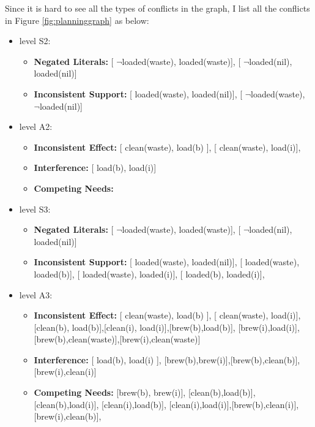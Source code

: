 \documentclass{article}%
\begin{document}
\begin{enumerate}
\begin{enumerate}
  Since it is hard to see all the types of conflicts in the graph, I list all the conflicts in Figure \ref{fig:planninggraph} as below:
  \begin{itemize}
  	\item  level S2:
  			\begin{itemize}
 				 \item \textbf{Negated Literals:} [ $\neg$loaded(waste), loaded(waste)], [ $\neg$loaded(nil), loaded(nil)]
 				 \item \textbf{Inconsistent Support:}  [ loaded(waste), loaded(nil)], [ $\neg$loaded(waste), $\neg$loaded(nil)]
			\end{itemize}
	\item  level A2: 
			\begin{itemize}
 				 \item \textbf{Inconsistent Effect:} [ clean(waste), load(b) ], [ clean(waste), load(i)], 
 				 \item \textbf{Interference:}  [ load(b), load(i)]
 				 \item \textbf{Competing Needs:} 
			\end{itemize}
	\item  level S3:
  			\begin{itemize}
 				 \item \textbf{Negated Literals:} [ $\neg$loaded(waste), loaded(waste)], [ $\neg$loaded(nil), loaded(nil)]
 				 \item \textbf{Inconsistent Support:}  [ loaded(waste), loaded(nil)], [ loaded(waste), loaded(b)], [ loaded(waste), loaded(i)], 
 				 [ loaded(b), loaded(i)], 
			\end{itemize}
	\item  level A3: 
			\begin{itemize}
 				 \item \textbf{Inconsistent Effect:} [ clean(waste), load(b) ], [ clean(waste), load(i)], 
 				 [clean(b), load(b)],[clean(i), load(i)],[brew(b),load(b)],
 				 [brew(i),load(i)],[brew(b),clean(waste)],[brew(i),clean(waste)]
 				 \item \textbf{Interference:}  [ load(b), load(i) ], [brew(b),brew(i)],[brew(b),clean(b)],[brew(i),clean(i)]
 				 \item \textbf{Competing Needs:}  [brew(b), brew(i)], [clean(b),load(b)], [clean(b),load(i)],
 				 [clean(i),load(b)], [clean(i),load(i)],[brew(b),clean(i)],[brew(i),clean(b)],
 				 

\end{itemize}
\end{itemize}
\end{enumerate}
\end{enumerate}
\end{document}
